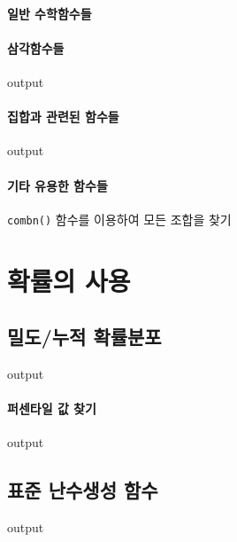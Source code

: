 \documentclass{book}
\begin{document}
\paragraph{일반 수학함수들}

\paragraph{삼각함수들}
\begin{Schunk}
\begin{Soutput}
output
\end{Soutput}
\end{Schunk}
\paragraph{집합과 관련된 함수들}
\begin{Schunk}
\begin{Soutput}
output
\end{Soutput}
\end{Schunk}
\paragraph{기타 유용한 함수들}
\texttt{combn()} 함수를 이용하여 모든 조합을 찾기

\section{확률의 사용}

\subsection{밀도/누적 확률분포}
\begin{Schunk}
\begin{Soutput}
output
\end{Soutput}
\end{Schunk}

\paragraph{퍼센타일 값 찾기}
\begin{Schunk}
\begin{Soutput}
output
\end{Soutput}
\end{Schunk}

\subsection{표준 난수생성 함수}
\begin{Schunk}
\begin{Soutput}
output
\end{Soutput}
\end{Schunk}
\end{document}
